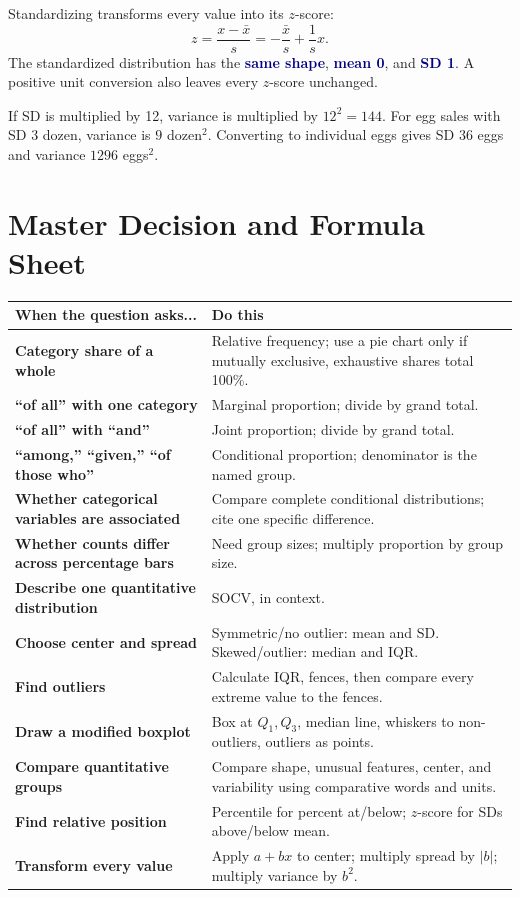 \documentclass[11pt]{article}
\newcommand{\key}[1]{\textbf{\textcolor{Navy}{#1}}}
\begin{document}
Standardizing transforms every value into its $z$-score:
\[
z=\frac{x-\bar{x}}{s}=-\frac{\bar{x}}{s}+\frac{1}{s}x.
\]
The standardized distribution has the \key{same shape}, \key{mean 0}, and \key{SD 1}. A positive unit conversion also leaves every $z$-score unchanged.

\begin{trapbox}
If SD is multiplied by 12, variance is multiplied by $12^2=144$. For egg sales with SD 3 dozen, variance is $9$ dozen$^2$. Converting to individual eggs gives SD $36$ eggs and variance $1296$ eggs$^2$.
\end{trapbox}

\newpage
\section{Master Decision and Formula Sheet}

\begin{tabularx}{\textwidth}{>{\bfseries\color{Navy}}p{2.05in} Y}
\toprule
When the question asks... & Do this\\
\midrule
Category share of a whole & Relative frequency; use a pie chart only if mutually exclusive, exhaustive shares total 100\%.\\
``of all'' with one category & Marginal proportion; divide by grand total.\\
``of all'' with ``and'' & Joint proportion; divide by grand total.\\
``among,'' ``given,'' ``of those who'' & Conditional proportion; denominator is the named group.\\
Whether categorical variables are associated & Compare complete conditional distributions; cite one specific difference.\\
Whether counts differ across percentage bars & Need group sizes; multiply proportion by group size.\\
Describe one quantitative distribution & SOCV, in context.\\
Choose center and spread & Symmetric/no outlier: mean and SD. Skewed/outlier: median and IQR.\\
Find outliers & Calculate IQR, fences, then compare every extreme value to the fences.\\
Draw a modified boxplot & Box at $Q_1,Q_3$, median line, whiskers to non-outliers, outliers as points.\\
Compare quantitative groups & Compare shape, unusual features, center, and variability using comparative words and units.\\
Find relative position & Percentile for percent at/below; $z$-score for SDs above/below mean.\\
Transform every value & Apply $a+b x$ to center; multiply spread by $|b|$; multiply variance by $b^2$.\\
\bottomrule
\end{tabularx}
\end{document}

